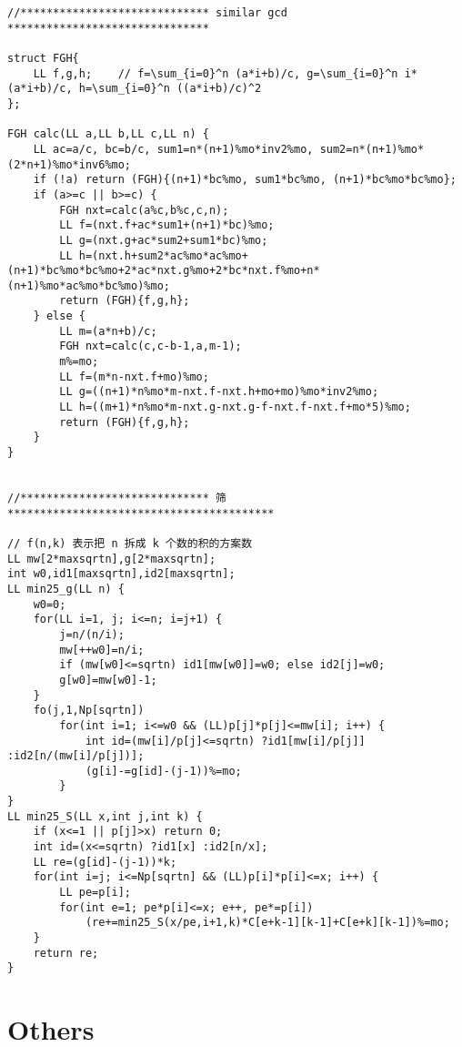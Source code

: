 \documentclass{article}
\begin{document}
\begin{lstlisting}
//***************************** similar gcd *******************************

struct FGH{
    LL f,g,h;    // f=\sum_{i=0}^n (a*i+b)/c, g=\sum_{i=0}^n i*(a*i+b)/c, h=\sum_{i=0}^n ((a*i+b)/c)^2
};

FGH calc(LL a,LL b,LL c,LL n) {
    LL ac=a/c, bc=b/c, sum1=n*(n+1)%mo*inv2%mo, sum2=n*(n+1)%mo*(2*n+1)%mo*inv6%mo;
    if (!a) return (FGH){(n+1)*bc%mo, sum1*bc%mo, (n+1)*bc%mo*bc%mo};
    if (a>=c || b>=c) {
        FGH nxt=calc(a%c,b%c,c,n);
        LL f=(nxt.f+ac*sum1+(n+1)*bc)%mo;
        LL g=(nxt.g+ac*sum2+sum1*bc)%mo;
        LL h=(nxt.h+sum2*ac%mo*ac%mo+(n+1)*bc%mo*bc%mo+2*ac*nxt.g%mo+2*bc*nxt.f%mo+n*(n+1)%mo*ac%mo*bc%mo)%mo;
        return (FGH){f,g,h};
    } else {
        LL m=(a*n+b)/c;
        FGH nxt=calc(c,c-b-1,a,m-1);
        m%=mo;
        LL f=(m*n-nxt.f+mo)%mo;
        LL g=((n+1)*n%mo*m-nxt.f-nxt.h+mo+mo)%mo*inv2%mo;
        LL h=((m+1)*n%mo*m-nxt.g-nxt.g-f-nxt.f-nxt.f+mo*5)%mo;
        return (FGH){f,g,h};
    }
}


//***************************** 筛 *****************************************

// f(n,k) 表示把 n 拆成 k 个数的积的方案数
LL mw[2*maxsqrtn],g[2*maxsqrtn];
int w0,id1[maxsqrtn],id2[maxsqrtn];
LL min25_g(LL n) {
    w0=0;
    for(LL i=1, j; i<=n; i=j+1) {
        j=n/(n/i);
        mw[++w0]=n/i;
        if (mw[w0]<=sqrtn) id1[mw[w0]]=w0; else id2[j]=w0;
        g[w0]=mw[w0]-1;
    }
    fo(j,1,Np[sqrtn])
        for(int i=1; i<=w0 && (LL)p[j]*p[j]<=mw[i]; i++) {
            int id=(mw[i]/p[j]<=sqrtn) ?id1[mw[i]/p[j]] :id2[n/(mw[i]/p[j])];
            (g[i]-=g[id]-(j-1))%=mo;
        }
}
LL min25_S(LL x,int j,int k) {
    if (x<=1 || p[j]>x) return 0;
    int id=(x<=sqrtn) ?id1[x] :id2[n/x];
    LL re=(g[id]-(j-1))*k;
    for(int i=j; i<=Np[sqrtn] && (LL)p[i]*p[i]<=x; i++) {
        LL pe=p[i];
        for(int e=1; pe*p[i]<=x; e++, pe*=p[i])
            (re+=min25_S(x/pe,i+1,k)*C[e+k-1][k-1]+C[e+k][k-1])%=mo;
    }
    return re;
}
\end{lstlisting}

\section{Others}
\end{document}
